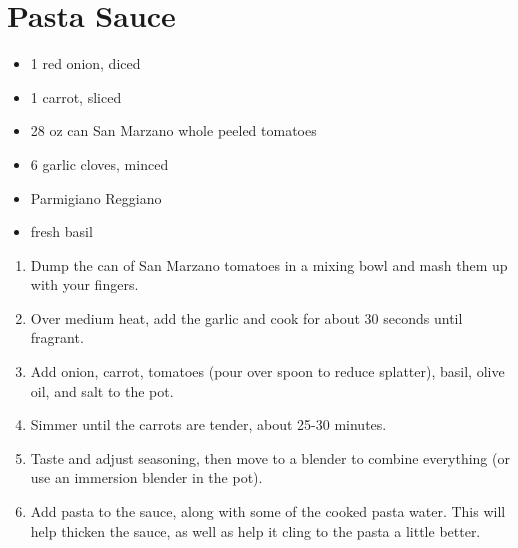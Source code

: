 \section{Pasta Sauce}

\begin{itemize}
\item 1 red onion, diced
\item 1 carrot, sliced
\item 28 oz can San Marzano whole peeled tomatoes
\item 6 garlic cloves, minced
\item Parmigiano Reggiano
\item fresh basil
\end{itemize}

\begin{enumerate}
\item Dump the can of San Marzano tomatoes in a mixing bowl and mash them up with your fingers.
\item Over medium heat, add the garlic and cook for about 30 seconds until fragrant.
\item Add onion, carrot, tomatoes (pour over spoon to reduce splatter), basil, olive oil, and salt to the pot.
\item Simmer until the carrots are tender, about 25-30 minutes.
\item Taste and adjust seasoning, then move to a blender to combine everything (or use an immersion blender in the pot).
\item Add pasta to the sauce, along with some of the cooked pasta water. This will help thicken the sauce, as well as
    help it cling to the pasta a little better.
\end{enumerate}
